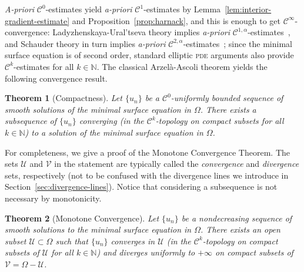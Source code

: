 \documentclass[a4paper,10pt,reqno]{amsart}
\newcommand{\N}{\mathbb{N}}
\newcommand{\sm}{-}
\newtheorem{theorem}{Theorem}[section]
\theoremstyle{definition}
\theoremstyle{remark}
\numberwithin{equation}{section}
\begin{document}
\emph{A-priori} $\mathcal{C}^0$-estimates yield \emph{a-priori} $\mathcal{C}^1$-estimates by Lemma~\ref{lem:interior-gradient-estimate} and Proposition~\ref{prop:harnack}, and this is enough to get $\mathcal{C}^\infty$-convergence: Ladyzhenskaya-Ural'tseva theory implies \emph{a-priori} $\mathcal{C}^{1,\alpha}$-estimates~\cite{LU}, and Schauder theory in turn implies \emph{a-priori} $\mathcal{C}^{2,\alpha}$-estimates~\cite{GT}; since the minimal surface equation is of second order, standard elliptic \textsc{pde} arguments also provide $\mathcal{C}^k$-estimates for all $k\in\N$. The classical Arzelà-Ascoli theorem yields the following convergence result.
	
\begin{theorem}[Compactness]\label{thm:compactness}
Let $\{u_n\}$ be a $\mathcal{C}^0$-uniformly bounded sequence of smooth solutions of the minimal surface equation in $\Omega$. There exists a subsequence of $\{u_n\}$ converging (in the $\mathcal{C}^k$-topology on compact subsets for all $k\in\N$) to a solution of the minimal surface equation in $\Omega$.
\end{theorem}
	
For completeness, we give a proof of the Monotone Convergence Theorem. The sets $\mathcal U$ and $\mathcal V$ in the statement are typically called the \emph{convergence} and \emph{divergence} sets, respectively (not to be confused with the divergence lines we introduce in Section~\ref{sec:divergence-lines}). Notice that considering a subsequence is not necessary by monotonicity.

\begin{theorem}[Monotone Convergence]\label{thm:MonConT}
Let $\{u_n\}$ be a nondecreasing sequence of smooth solutions to the minimal surface equation in $\Omega$. There exists an open subset $\mathcal U\subset\Omega$ such that $\{u_n\}$ converges in $\mathcal U$ (in the ${\mathcal{C}}^k$-topology on compact subsets of $\mathcal U$ for all $k\in\N$) and diverges uniformly to $+\infty$ on compact subsets of $\mathcal{V}=\Omega\sm\mathcal{U}$.  	
\end{theorem}
\end{document}
